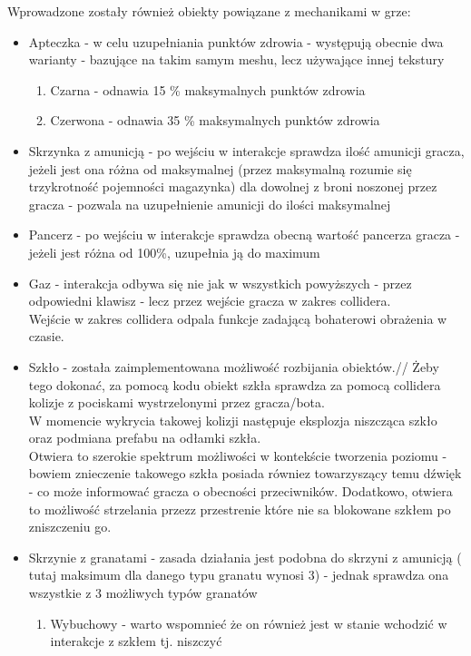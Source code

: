 Wprowadzone zostały również obiekty powiązane z mechanikami w grze:
\begin{itemize}
    \item Apteczka - w celu uzupełniania punktów zdrowia - występują obecnie dwa warianty - bazujące na takim samym meshu, lecz używające innej tekstury
    \begin{enumerate}
        \item Czarna - odnawia 15 \% maksymalnych punktów zdrowia
        \item Czerwona - odnawia 35 \% maksymalnych punktów zdrowia
    \end{enumerate}
    \item Skrzynka z amunicją - po wejściu w interakcje sprawdza ilość amunicji gracza, jeżeli jest ona różna od maksymalnej (przez maksymalną rozumie się trzykrotność pojemności magazynka) dla dowolnej z broni noszonej przez gracza - pozwala na uzupełnienie amunicji do ilości maksymalnej
    \item Pancerz - po wejściu w interakcje sprawdza obecną wartość pancerza gracza - jeżeli jest różna od 100\%, uzupełnia ją do maximum
    \item Gaz - interakcja odbywa się nie jak w wszystkich powyższych - przez odpowiedni klawisz - lecz przez wejście gracza w zakres collidera. \\
    Wejście w zakres collidera odpala funkcje zadającą bohaterowi obrażenia w czasie.
    \item Szkło - została zaimplementowana możliwość rozbijania obiektów.//
    Żeby tego dokonać, za pomocą kodu obiekt szkła sprawdza za pomocą collidera kolizje z pociskami wystrzelonymi przez gracza/bota.\\
    W momencie wykrycia takowej kolizji następuje eksplozja niszcząca szkło oraz podmiana prefabu na odłamki szkła.\\
    Otwiera to szerokie spektrum możliwości w kontekście tworzenia poziomu - bowiem znieczenie takowego szkła posiada równiez towarzyszący temu dźwięk - co może informować gracza o obecności przeciwników.
    Dodatkowo, otwiera to możliwość strzelania przezz przestrenie które nie sa blokowane szkłem po zniszczeniu go.
    \item Skrzynie z granatami - zasada działania jest podobna do skrzyni z amunicją ( tutaj maksimum dla danego typu granatu wynosi 3) - jednak sprawdza ona wszystkie z 3 możliwych typów granatów
    \begin{enumerate}
        \item Wybuchowy - warto wspomnieć że on również jest w stanie wchodzić w interakcje z szkłem tj. niszczyć

\end{enumerate}
\end{itemize}
